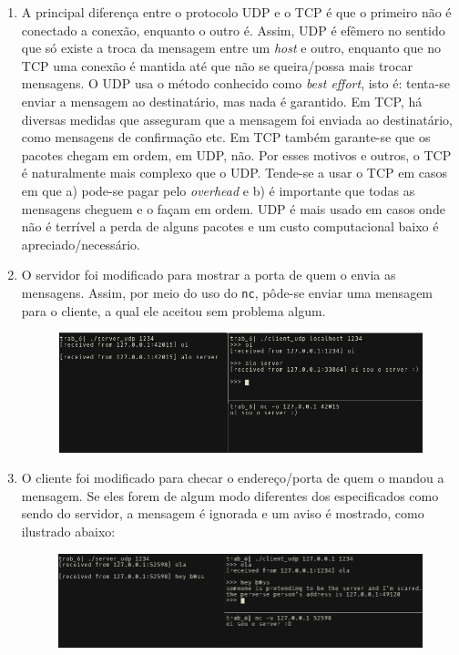 \documentclass[11pt]{article}
\newcommand{\tit}[1]{\textit{#1}}
\newcommand{\ttt}[1]{\texttt{#1}}
\begin{document}
\begin{enumerate}
\item A principal diferença entre o protocolo UDP e o TCP é que o primeiro
não é conectado a conexão, enquanto o outro é. Assim, UDP é efêmero no sentido
que só existe a troca da mensagem entre um \tit{host} e outro, enquanto que no
TCP uma conexão é mantida até que não se queira/possa mais trocar mensagens.
O UDP usa o método conhecido como \tit{best effort}, isto é: 
tenta-se enviar a mensagem ao destinatário,
mas nada é garantido. Em TCP, há diversas medidas que asseguram que a mensagem
foi enviada ao destinatário, como mensagens de confirmação etc.
Em TCP também garante-se que os pacotes chegam em ordem, em UDP, não.
Por esses motivos e outros, o TCP é naturalmente mais complexo que o UDP. 
Tende-se a usar o TCP em casos em que a) pode-se pagar pelo \tit{overhead} e
b) é importante que todas as mensagens cheguem e o façam em ordem. UDP é mais
usado em casos onde não é terrível a perda de alguns pacotes e um custo
computacional baixo é apreciado/necessário.

\item O servidor foi modificado para mostrar a porta de quem o envia as 
	mensagens. Assim, por meio do uso do \ttt{nc}, pôde-se enviar uma 
	mensagem para o cliente, a qual ele aceitou sem problema algum.
\begin{figure}[H]
	\centering
	\includegraphics[width=1.0\linewidth]{img/malicia.png}
\end{figure}

\item O cliente foi modificado para checar o endereço/porta de quem o mandou
	a mensagem. Se eles forem de algum modo diferentes dos especificados como
	sendo do servidor, a mensagem é ignorada e um aviso é mostrado, como
	ilustrado abaixo:
\begin{figure}[H]
	\centering
	\includegraphics[width=1.0\linewidth]{img/tepeguei.png}
\end{figure}

\end{enumerate}
\end{document}
